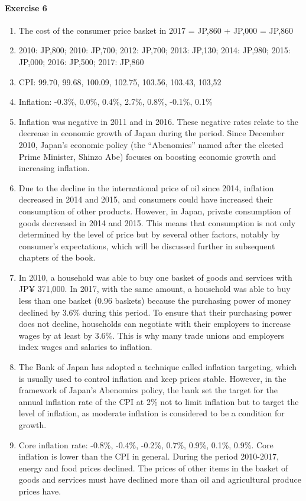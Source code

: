 \documentclass[12pt]{article}
\numberwithin{equation}{section}
\begin{document}
\paragraph{Exercise 6}
\begin{enumerate}[label=\alph*.]
    \item The cost of the consumer price basket in 2017 = JP,860 + JP,000 = JP,860
    \item 2010: JP,800; 2010: JP,700; 2012: JP,700; 2013: JP,130; 2014: JP,980; 2015: JP,000; 2016: JP,500; 2017: JP,860
    \item CPI: 99.70, 99.68, 100.09, 102.75, 103.56, 103.43, 103,52
    \item Inflation: -0.3\%, 0.0\%, 0.4\%, 2.7\%, 0.8\%, -0.1\%, 0.1\%
    \item Inflation was negative in 2011 and in 2016. These negative rates relate to the decrease in economic growth of Japan during the period. Since December 2010, Japan's economic policy (the ``Abenomics'' named after the elected Prime Minister, Shinzo Abe) focuses on boosting economic growth and increasing inflation.
    \item Due to the decline in the international price of oil since 2014, inflation decreased in 2014 and 2015, and consumers could have increased their consumption of other products. However, in Japan, private consumption of goods decreased in 2014 and 2015. This means that consumption is not only determined by the level of price but by several other factors, notably by consumer's expectations, which will be discussed further in subsequent chapters of the book.
    \item In 2010, a household was able to buy one basket of goods and services with JP¥ 371,000. In 2017, with the same amount, a household was able to buy less than one basket (0.96 baskets) because the purchasing power of money declined by 3.6\% during this period. To ensure that their purchasing power does not decline, households can negotiate with their employers to increase wages by at least by 3.6\%. This is why many trade unions and employers index wages and salaries to inflation.
    \item The Bank of Japan has adopted a technique called inflation targeting, which is usually used to control inflation and keep prices stable. However, in the framework of Japan's Abenomics policy, the bank set the target for the annual inflation rate of the CPI at 2\% not to limit inflation but to target the level of inflation, as moderate inflation is considered to be a condition for growth.
    \item Core inflation rate: -0.8\%, -0.4\%, -0.2\%, 0.7\%, 0.9\%, 0.1\%, 0.9\%. Core inflation is lower than the CPI in general. During the period 2010-2017, energy and food prices declined. The prices of other items in the basket of goods and services must have declined more than oil and agricultural produce prices have.
\end{enumerate}
\end{document}

